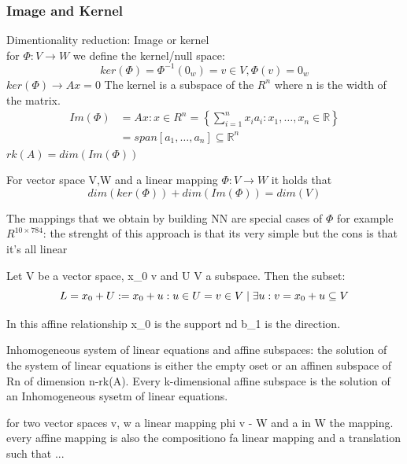 \subsubsection*{Image and Kernel}
Dimentionality reduction:
Image or kernel\\
for $\Phi : V \rightarrow W$ we define the kernel/null space:
$$ker(\Phi) = \Phi^{-1}(0_w) = {v \in V, \Phi(v) = 0_w}$$
$ ker(\Phi) \rightarrow Ax = 0 $ 
The kernel is a subspace of the $ R^n $ where n is the width of the matrix.  
\begin{align*}
    Im(\Phi) &= {Ax: x \in R^n } = \left\{ \sum_{i=1}^{n}{x_ia_i:x_{1}, \ldots,x_{n} \in \mathbb{R}} \right\}\\ &= span[a_{1}, \ldots,a_{n}] \subseteq \mathbb{R}^n
\end{align*}
$ rk(A) = dim(Im(\Phi)) $
\begin{theorem}
    For vector space V,W and a linear mapping $ \Phi: V \rightarrow W  $ it holds that \[ 
        dim(ker(\Phi)) + dim(Im(\Phi)) = dim(V)
    \]
\end{theorem}
The mappings that we obtain by building NN are special cases of $ \Phi $ for example $ R^{10\times784} $: the strenght of this approach is that its very simple but the cons is that it's all linear
\begin{definition}
    Let V be a vector space, x_0 \in v and U \subseteq V a subspace. Then the subset: \[ 
        L = x_0 + U : = {x_0+u: u\in U} \\
        ={v\in V \mid \exists u : v = x_0 +u} \subseteq V
    \]
\end{definition}
In this affine relationship x_0 is the support nd b_1 is the direction.
\begin{remark}
    Inhomogeneous system of linear equations and affine subspaces:
    the solution of the system of linear equations  is either the empty oset or an affinen subspace of Rn of dimension n-rk(A). Every k-dimensional affine subspace is the solution of an Inhomogeneous sysetm of linear equations. 
\end{remark}
\begin{definition}
    for two vector spaces v, w a linear mapping phi v - W and a in W the mapping.\\
    every affine mapping is also the compositiono fa linear mapping and a translation such that ...
\end{definition}
